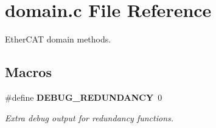 \section{domain.\-c File Reference}
\label{domain_8c}


Ether\-C\-A\-T domain methods.  


\subsection*{Macros}
\begin{DoxyCompactItemize}
\item 
\#define {\bf D\-E\-B\-U\-G\-\_\-\-R\-E\-D\-U\-N\-D\-A\-N\-C\-Y}~0\label{domain_8c_a06f1befc7d03dbef13e823d26863aec4}

\begin{DoxyCompactList}\small\item\em Extra debug output for redundancy functions. \end{DoxyCompactList}\end{DoxyCompactItemize}
